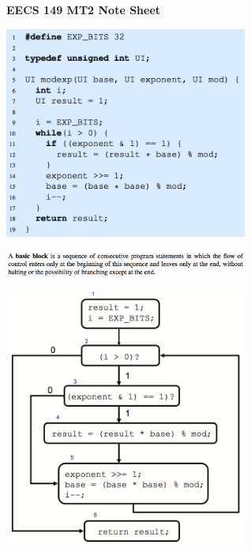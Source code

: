 \documentclass[10pt,landscape]{article}
\begin{document}
\raggedright
\footnotesize
\begin{multicols}{3}


\setlength{\premulticols}{1pt}
\setlength{\postmulticols}{1pt}
\setlength{\multicolsep}{1pt}
\setlength{\columnsep}{2pt}

\begin{center}
     \Large{\textbf{EECS 149 MT2 Note Sheet}} \\
\end{center}
\begin{center}
\includegraphics*[width = 8cm]{Fig1.png}\\
\end{center}

\begin{center}
\includegraphics*[width = 8cm]{Fig2.png}\\
\end{center}

\begin{center}
\includegraphics*[width = 8cm]{Fig3.png}\\
\end{center}


\end{multicols}
\end{document}
